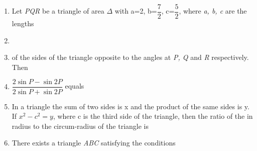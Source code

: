 \documentclass[journal,12pt,twocolumn]{IEEEtran}
\begin{document}
\begin{enumerate}
 \begin{itemize}
 \end{itemize}
 \item Let \textsl{PQR} be a triangle of area $\Delta$ with a=2, b=$\dfrac{7}{2}$, c=$\dfrac{5}{2}$, where \textsl{a, b, c} are the lengths \item[~] \item[~]of the sides of the triangle opposite to the angles at \textsl{P, Q} and \textsl{R} respectively. Then \item[~]$\dfrac{2\sin P-\sin 2P}{2\sin P+\sin 2P}$ equals
 \begin{itemize}
 \end{itemize}
 \item In a triangle the sum of two sides is x and the product of the same sides is y. If $x^2-c^2=y$, where c is the third side of the triangle, then the ratio of the in radius to the circum-radius of the triangle is
 \begin{itemize}
 \end{itemize}
 \item There exists a triangle \textsl{ABC} satisfying the conditions

\end{enumerate}
\end{document}
